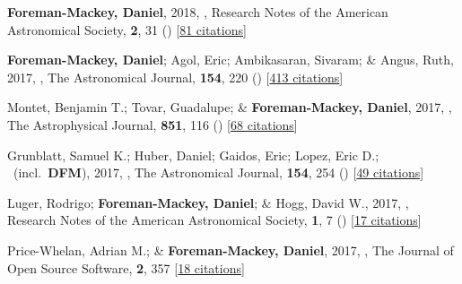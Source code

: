 \item[{\color{numcolor}\scriptsize32}] \textbf{Foreman-Mackey, Daniel}, 2018, , Research Notes of the American Astronomical Society, \textbf{2}, 31 () [\href{https://ui.adsabs.harvard.edu/abs/2018RNAAS...2...31F}{81 citations}]

\item[{\color{numcolor}\scriptsize31}] \textbf{Foreman-Mackey, Daniel}; Agol, Eric; Ambikasaran, Sivaram; \& Angus, Ruth, 2017, , The Astronomical Journal, \textbf{154}, 220 () [\href{https://ui.adsabs.harvard.edu/abs/2017AJ....154..220F}{413 citations}]

\item[{\color{numcolor}\scriptsize30}] Montet, Benjamin T.; Tovar, Guadalupe; \& \textbf{Foreman-Mackey, Daniel}, 2017, , The Astrophysical Journal, \textbf{851}, 116 () [\href{https://ui.adsabs.harvard.edu/abs/2017ApJ...851..116M}{68 citations}]

\item[{\color{numcolor}\scriptsize29}] Grunblatt, Samuel K.; Huber, Daniel; Gaidos, Eric; Lopez, Eric D.; \etal\ (incl.\ \textbf{DFM}), 2017, , The Astronomical Journal, \textbf{154}, 254 () [\href{https://ui.adsabs.harvard.edu/abs/2017AJ....154..254G}{49 citations}]

\item[{\color{numcolor}\scriptsize28}] Luger, Rodrigo; \textbf{Foreman-Mackey, Daniel}; \& Hogg, David W., 2017, , Research Notes of the American Astronomical Society, \textbf{1}, 7 () [\href{https://ui.adsabs.harvard.edu/abs/2017RNAAS...1....7L}{17 citations}]

\item[{\color{numcolor}\scriptsize27}] Price-Whelan, Adrian M.; \& \textbf{Foreman-Mackey, Daniel}, 2017, , The Journal of Open Source Software, \textbf{2}, 357 [\href{https://ui.adsabs.harvard.edu/abs/2017JOSS....2..357P}{18 citations}]

